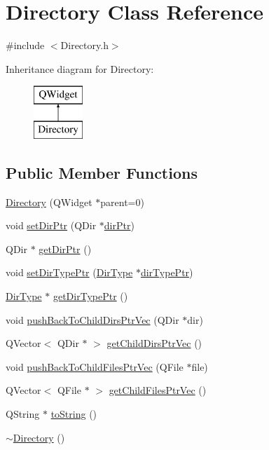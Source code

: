 \hypertarget{class_directory}{\section{Directory Class Reference}
\label{class_directory}
}


{\ttfamily \#include $<$Directory.\-h$>$}

Inheritance diagram for Directory\-:\begin{figure}[H]
\begin{center}
\leavevmode
\includegraphics[height=2.000000cm]{class_directory}
\end{center}
\end{figure}
\subsection*{Public Member Functions}
\begin{DoxyCompactItemize}
\item 
\hyperlink{class_directory_aeecdbc52ed5d2069d57c8e5618a73f1e}{Directory} (Q\-Widget $\ast$parent=0)
\item 
void \hyperlink{class_directory_ad17ee176714d11afae82e7bf20def5a5}{set\-Dir\-Ptr} (Q\-Dir $\ast$\hyperlink{class_directory_ae8d40a5989c8fe90988aa9517cb87a9a}{dir\-Ptr})
\item 
Q\-Dir $\ast$ \hyperlink{class_directory_a1ae52186cc94eee26fc6161b67dd0ba2}{get\-Dir\-Ptr} ()
\item 
void \hyperlink{class_directory_af3cac89c90ab3097e7a7a36be6b12c64}{set\-Dir\-Type\-Ptr} (\hyperlink{class_directory_a1c40bdd8c03ef51a29fa097c325fe345}{Dir\-Type} $\ast$\hyperlink{class_directory_aeb912c1ed24b2bea1febce142fa3a57e}{dir\-Type\-Ptr})
\item 
\hyperlink{class_directory_a1c40bdd8c03ef51a29fa097c325fe345}{Dir\-Type} $\ast$ \hyperlink{class_directory_ae44daf13fc34b0b1e1d4198feec67a94}{get\-Dir\-Type\-Ptr} ()
\item 
void \hyperlink{class_directory_a4ba19180f0e71eb407d93e6b83ea7802}{push\-Back\-To\-Child\-Dirs\-Ptr\-Vec} (Q\-Dir $\ast$dir)
\item 
Q\-Vector$<$ Q\-Dir $\ast$ $>$ \hyperlink{class_directory_ab6f2b6cdc1da5fb168743cdfbece2f87}{get\-Child\-Dirs\-Ptr\-Vec} ()
\item 
void \hyperlink{class_directory_a9d5365aa51a62931af93272d97ea2b85}{push\-Back\-To\-Child\-Files\-Ptr\-Vec} (Q\-File $\ast$file)
\item 
Q\-Vector$<$ Q\-File $\ast$ $>$ \hyperlink{class_directory_a769dcd01a9476d1556384c1572156a04}{get\-Child\-Files\-Ptr\-Vec} ()
\item 
Q\-String $\ast$ \hyperlink{class_directory_a4f0ef25beff4469b7eb06765a0b1fa26}{to\-String} ()
\item 
\hyperlink{class_directory_affbde8714685c61601421097d621341d}{$\sim$\-Directory} ()
\end{DoxyCompactItemize}
